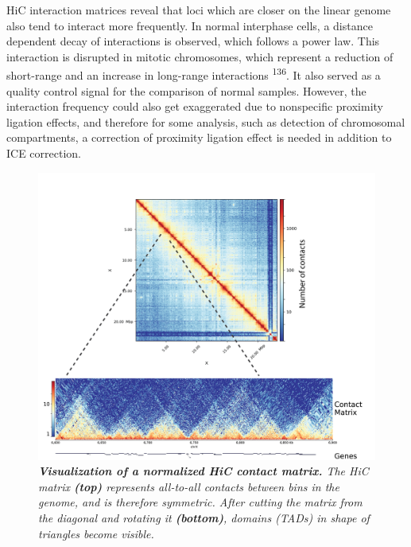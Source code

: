 \documentclass[11pt,twoside]{MPIthesis}
\theoremstyle{definition}
\theoremstyle{definition}
\theoremstyle{definition}
\theoremstyle{remark}
\begin{document}
HiC interaction matrices reveal that loci which are closer on the linear
genome also tend to interact more frequently. In normal interphase
cells, a distance dependent decay of interactions is observed, which
follows a power law. This interaction is disrupted in mitotic
chromosomes, which represent a reduction of short-range and an increase
in long-range interactions \textsuperscript{136}. It also served as a
quality control signal for the comparison of normal samples. However,
the interaction frequency could also get exaggerated due to nonspecific
proximity ligation effects, and therefore for some analysis, such as
detection of chromosomal compartments, a correction of proximity
ligation effect is needed in addition to ICE correction.
\begin{figure}

{\centering \includegraphics[width=0.8\linewidth]{figures/intro_fig4} 

}

\caption[Visualization of a normalized HiC contact matrix]{\emph{\textbf{Visualization of a normalized HiC contact
matrix.} The HiC matrix \textbf{(top)} represents all-to-all contacts
between bins in the genome, and is therefore symmetric. After cutting
the matrix from the diagonal and rotating it \textbf{(bottom)}, domains
(TADs) in shape of triangles become visible.}}\label{fig:unnamed-chunk-4}
\end{figure}
\end{document}
